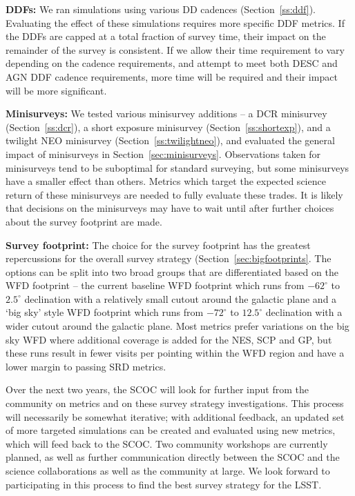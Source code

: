 {\bf DDFs:} We ran simulations using various DD cadences (Section~\ref{ss:ddf}). Evaluating the effect of these simulations requires more specific DDF metrics. If the DDFs are capped at a total fraction of survey time, their impact on the remainder of the survey is consistent. If we allow their time requirement to vary depending on the cadence requirements, and attempt to meet both DESC and AGN DDF cadence requirements, more time will be required and their impact will be more significant.

{\bf Minisurveys:} We tested various minisurvey additions -- a DCR minisurvey (Section~\ref{ss:dcr}), a short exposure minisurvey (Section~\ref{ss:shortexp}), and a twilight NEO minisurvey (Section~\ref{ss:twilightneo}), and evaluated the general impact of minisurveys in Section~\ref{sec:minisurveys}. Observations taken for minisurveys tend to be suboptimal for standard surveying, but some minisurveys have a smaller effect than others. Metrics which target the expected science return of these minisurveys are needed to fully evaluate these trades. It is likely that decisions on the minisurveys may have to wait until after further choices about the survey footprint are made.

{\bf Survey footprint:} The choice for the survey footprint has the greatest repercussions for the overall survey strategy (Section~\ref{sec:bigfootprints}. The options can be split into two broad groups that are differentiated based on the WFD footprint -- the current baseline WFD footprint which runs from $-62^\circ$ to $2.5^\circ$ declination with a relatively small cutout around the galactic plane and a `big sky' style WFD footprint which runs from  $-72^\circ$ to $12.5^\circ$ declination with a wider cutout around the galactic plane. Most metrics prefer variations on the big sky WFD where additional coverage is added for the NES, SCP and GP, but these runs result in fewer visits per pointing within the WFD region and have a lower margin to passing SRD metrics. 

Over the next two years, the SCOC will look for further input from the community on metrics and on these survey strategy investigations. This process will necessarily be somewhat iterative; with additional feedback, an updated set of more targeted simulations can be created and evaluated using new metrics, which will feed back to the SCOC. Two community workshops are currently planned, as well as further communication directly between the SCOC and the science collaborations as well as the community at large. We look forward to participating in this process to find the best survey strategy for the LSST.

